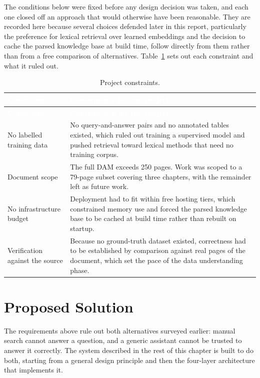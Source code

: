 The conditions below were fixed before any design decision was taken, and each one closed off an approach that would otherwise have been reasonable. They are recorded here because several choices defended later in this report, particularly the preference for lexical retrieval over learned embeddings and the decision to cache the parsed knowledge base at build time, follow directly from them rather than from a free comparison of alternatives. Table~\ref{tab:constraints} sets out each constraint and what it ruled out.

\begin{longtable}{|p{}|p{}|}
\caption{Project constraints.}\label{tab:constraints}\\
\hline
\rowcolor{myblue}\textcolor{white}{\textbf{Constraint}} & \textcolor{white}{\textbf{Consequence for the project}} \\
\hline
\endfirsthead
\hline
\rowcolor{myblue}\textcolor{white}{\textbf{Constraint}} & \textcolor{white}{\textbf{Consequence for the project}} \\
\hline
\endhead
No labelled training data & No query-and-answer pairs and no annotated tables existed, which ruled out training a supervised model and pushed retrieval toward lexical methods that need no training corpus. \\ \hline
Document scope & The full DAM exceeds 250 pages. Work was scoped to a 79-page subset covering three chapters, with the remainder left as future work. \\ \hline
No infrastructure budget & Deployment had to fit within free hosting tiers, which constrained memory use and forced the parsed knowledge base to be cached at build time rather than rebuilt on startup. \\ \hline
Verification against the source & Because no ground-truth dataset existed, correctness had to be established by comparison against real pages of the document, which set the pace of the data understanding phase. \\ \hline
\end{longtable}

\section{Proposed Solution}

The requirements above rule out both alternatives surveyed earlier: manual search cannot
answer a question, and a generic assistant cannot be trusted to answer it correctly. The
system described in the rest of this chapter is built to do both, starting from a general
design principle and then the four-layer architecture that implements it.

